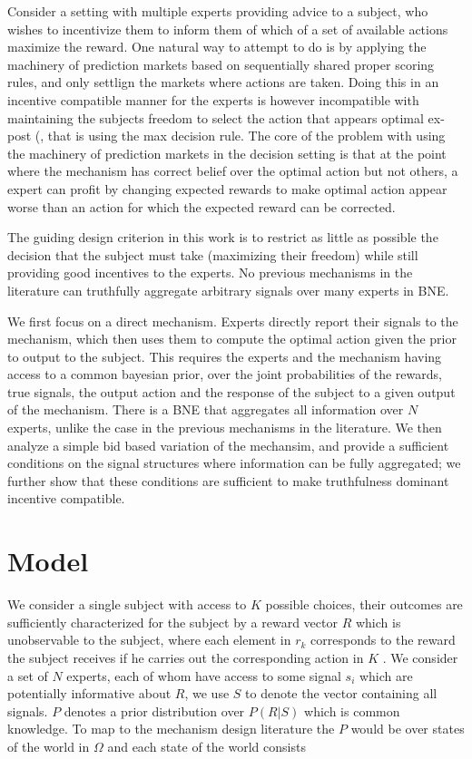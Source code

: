 
Consider a setting with multiple experts providing advice to a subject, who wishes to incentivize them to inform them of which of a set of available actions maximize the reward.
One natural way to attempt to do is by applying the machinery of prediction markets based on sequentially shared proper scoring rules, and only settlign the markets where actions are taken. Doing this in an incentive compatible manner for the experts is however incompatible with maintaining the subjects freedom to select the action that appears optimal ex-post (\cite{othman2010decision,  chen2014eliciting}, that is using the max decision rule. 
The core of the problem with using the machinery of prediction markets in the decision setting is that at the point where the mechanism has correct belief over the optimal action but not others, a expert  can profit by changing expected rewards to make optimal action appear worse than an action for which the expected reward can be corrected.


The guiding design criterion in this work is to restrict as little as possible the decision that the subject must take (maximizing their freedom) while still providing good incentives to the experts. No previous mechanisms in the literature can truthfully aggregate arbitrary signals over many experts in BNE. 

We first focus on a direct mechanism. Experts directly report their signals to the mechanism, which then uses them to compute the optimal action given the prior to output to the subject. This requires  the experts and the mechanism having access to a common bayesian prior, over the joint probabilities of the rewards, true signals, the output action and the response of the subject to a given output of the mechanism. There is a BNE that aggregates all information over $N$ experts, unlike the case in the previous mechanisms in the literature.
We then analyze a simple bid based variation of the mechansim, and provide a sufficient conditions on the signal structures where information can be fully aggregated; we further show that these conditions are sufficient to make truthfulness dominant incentive compatible.  



\section{Model}

We consider a single subject with access to $K$ possible choices, their outcomes are sufficiently characterized for the subject by a reward vector $R$ which is unobservable to the subject, where each element in $r_k$ corresponds to the reward the subject receives if he carries out the corresponding action in $K$ . We consider a set of $N$ experts, each of whom have access to some signal $s_i$ which are potentially informative about $R$, we use $S$ to denote the vector containing all signals.  $P$ denotes a prior distribution over $P(R|S) $ which is common knowledge. To map to the mechanism design literature the $P$ would be over states of the world in $\Omega$ and each state of the world consists


